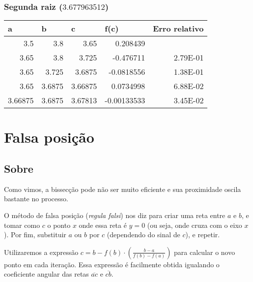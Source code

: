 \documentclass[12pt]{article}
\begin{document}
\subsubsection{Segunda raiz (\(3.677963512\))}

\begin{table}[H]
\centering
\begin{tabular}{@{}rrrrr@{}}
\toprule
\multicolumn{1}{l}{a} & \multicolumn{1}{l}{b} & \multicolumn{1}{l}{c} & \multicolumn{1}{l}{f(c)} & \multicolumn{1}{l}{Erro relativo} \\ \midrule
3.5                   & 3.8                   & 3.65                  & 0.208439                 & \multicolumn{1}{l}{}              \\
3.65                  & 3.8                   & 3.725                 & -0.476711                & 2.79E-01                          \\
3.65                  & 3.725                 & 3.6875                & -0.0818556               & 1.38E-01                          \\
3.65                  & 3.6875                & 3.66875               & 0.0734998                & 6.88E-02                          \\
3.66875               & 3.6875                & 3.67813               & -0.00133533              & 3.45E-02                          \\ \bottomrule
\end{tabular}
\end{table}

\section{Falsa posição}
\subsection{Sobre}
Como vimos, a bissecção pode não ser muito eficiente e sua proximidade oscila bastante no processo.

O método de falsa posição (\textit{regula falsi}) nos diz para criar uma reta entre \(a\) e \(b\), e tomar como \(c\) o ponto \(x\) onde essa reta é \(y=0\) (ou seja, onde cruza com o eixo \(x\)). Por fim, substituir \(a\) ou \(b\) por \(c\) (dependendo do sinal de \(c\)), e repetir.

Utilizaremos a expressão \(c = b-f(b)\cdot(\frac{b-a}{f(b)-f(a)})\) para calcular o novo ponto em cada iteração. Essa expressão é facilmente obtida igualando o coeficiente angular das retas \(\overline{ac}\) e \(\overline{cb}\).
\end{document}
